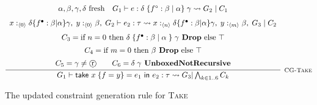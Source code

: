 \begin{figure}
    \centering
    \[
        \infer[\textsc{\footnotesize{CG-Take}}]{
            G_1 \vdash \textsf{take } x\; \{ f = y \} = e_1 \textsf{ in } e_2
                : \tau \rightsquigarrow G_3 | \bigwedge_{k \in 1..6} C_k
        }{
            \begin{array}{c}
                \alpha, \beta, \gamma, \delta \text{ fresh}
                \hspace{1em}
                G_1 \vdash e : \delta\; \{ f^\circ : \beta\; |\; \alpha \}\;
                    \gamma \rightsquigarrow G_2\; |\; C_1 \\[7pt]
                x :_{\langle 0 \rangle} \delta \{ f^\bullet : \beta | \alpha \} \gamma,\;
                    y :_{\langle 0 \rangle} \beta,\;
                    G_2 \vdash e_2 : \tau 
                     \rightsquigarrow     
                    x :_{\langle n \rangle} \delta \{ f^\bullet : \beta | \alpha \} \gamma,\;
                    y :_{\langle m \rangle} \beta,\;
                    G_3\; |\; C_2 \\[7pt]
                C_3 = \text{if } n = 0 \text{ then } 
                    \delta\; \{ f^\bullet : \beta\; |\; \alpha\; \}\; \gamma \textbf{ Drop}
                    \text{ else } \top \\[5pt]
                C_4 = \text{if } m = 0 \text{ then } 
                    \beta \textbf{ Drop}
                    \text{ else } \top \\[5pt]
                C_5 = \gamma \neq \text{\textcircled{r}}
                \hspace{2em}
                C_6 = \delta\; \gamma \textbf{ UnboxedNotRecursive}
            \end{array}
        }
    \]
    
    \caption{The updated constraint generation rule for \textsc{Take}}
    \label{fig:takeconstraintgen}
\end{figure}

